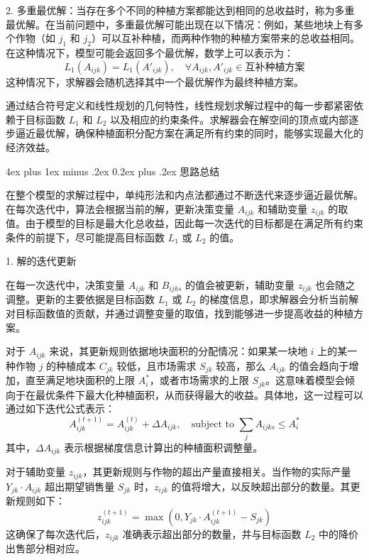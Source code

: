 \documentclass[12pt,a4paper]{nmmcm}
\makeatletter
\renewcommand\subsubsection{\@startsection{subsubsection}{3}{1em}%
  {4ex plus 1ex minus .2ex}%
  {0.2ex plus .2ex}%
  {\normalfont\large\bfseries}}
\makeatother
\begin{document}
2. 多重最优解：当存在多个不同的种植方案都能达到相同的总收益时，称为多重最优解。在当前问题中，多重最优解可能出现在以下情况：例如，某些地块上有多个作物（如 $j_1$ 和 $j_2$）可以互补种植，而两种作物的种植方案带来的总收益相同。在这种情况下，模型可能会返回多个最优解，数学上可以表示为：
   \[
   L_1(A_{ijk}) = L_1(A'_{ijk}), \quad \forall A_{ijk}, A'_{ijk} \in \text{互补种植方案}
   \]
   这种情况下，求解器会随机选择其中一个最优解作为最终种植方案。

通过结合符号定义和线性规划的几何特性，线性规划求解过程中的每一步都紧密依赖于目标函数 $L_1$ 和 $L_2$ 以及相应的约束条件。求解器会在解空间的顶点或内部逐步逼近最优解，确保种植面积分配方案在满足所有约束的同时，能够实现最大化的经济效益。

\subsubsection{思路总结}

在整个模型的求解过程中，单纯形法和内点法都通过不断迭代来逐步逼近最优解。在每次迭代中，算法会根据当前的解，更新决策变量 $A_{ijk}$ 和辅助变量 $z_{ijk}$ 的取值。由于模型的目标是最大化总收益，因此每一次迭代的目标都是在满足所有约束条件的前提下，尽可能提高目标函数 $L_1$ 或 $L_2$ 的值。

 1. 解的迭代更新

在每一次迭代中，决策变量 $A_{ijk}$ 和 $B_{ijks}$ 的值会被更新，辅助变量 $z_{ijk}$ 也会随之调整。更新的主要依据是目标函数 $L_1$ 或 $L_2$ 的梯度信息，即求解器会分析当前解对目标函数值的贡献，并通过调整变量的取值，找到能够进一步提高收益的种植方案。

对于 $A_{ijk}$ 来说，其更新规则依据地块面积的分配情况：如果某一块地 $i$ 上的某一种作物 $j$ 的种植成本 $C_{jk}$ 较低，且市场需求 $S_{jk}$ 较高，那么 $A_{ijk}$ 的值会趋向于增加，直至满足地块面积的上限 $A_i^*$，或者市场需求的上限 $S_{jk}$。这意味着模型会倾向于在最优条件下最大化种植面积，从而获得最大的收益。具体地，这一过程可以通过如下迭代公式表示：
\[
A_{ijk}^{(t+1)} = A_{ijk}^{(t)} + \Delta A_{ijk}, \quad \text{subject to } \sum_j A_{ijks} \leq A_i^*
\]
其中，$\Delta A_{ijk}$ 表示根据梯度信息计算出的种植面积调整量。

对于辅助变量 $z_{ijk}$，其更新规则与作物的超出产量直接相关。当作物的实际产量 $Y_{jk} \cdot A_{ijk}$ 超出期望销售量 $S_{jk}$ 时，$z_{ijk}$ 的值将增大，以反映超出部分的数量。其更新规则如下：
\[
z_{ijk}^{(t+1)} = \max(0, Y_{jk} \cdot A_{ijk}^{(t+1)} - S_{jk})
\]
这确保了每次迭代后，$z_{ijk}$ 准确表示超出部分的数量，并与目标函数 $L_2$ 中的降价出售部分相对应。
\end{document}
